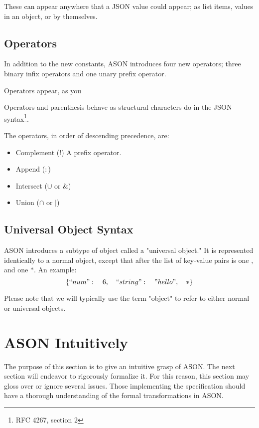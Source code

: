 \documentclass[letterpaper]{article}
\begin{document}
These can appear anywhere that a JSON value could appear; as list items, values
in an object, or by themselves.

\subsection{Operators}
In addition to the new constants, ASON introduces four new operators; three
binary infix operators and one unary prefix operator.

Operators appear, as you

Operators and parenthesis behave as structural characters do in the JSON
syntax\footnote{RFC 4267, section 2}.

\begin{samepage}
The operators, in order of descending precedence, are:

\begin{itemize}
\item Complement (\(!\)) A prefix operator.
\item Append (\(:\))
\item Intersect (\(\cup\) or \(\&\))
\item Union (\(\cap\) or \(|\))
\end{itemize}
\end{samepage}

\begin{samepage}
\subsection{Universal Object Syntax}
ASON introduces a subtype of object called a "universal object." It is
represented identically to a normal object, except that after the list of
key-value pairs is one \(,\) and one \(*\). An example:
%
\begin{equation}
\{ ``num":\quad6,\quad ``string":\quad"hello",\quad *\}
\end{equation}
\end{samepage}

Please note that we will typically use the term "object" to refer to either
normal or universal objects.

\section{ASON Intuitively}
The purpose of this section is to give an intuitive grasp of ASON. The next
section will endeavor to rigorously formalize it. For this reason, this section
may gloss over or ignore several issues. Those implementing the specification
should have a thorough understanding of the formal transformations in ASON.
\end{document}
